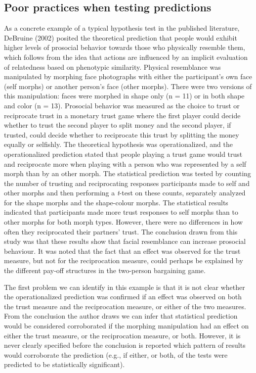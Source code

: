 \documentclass[english,doc,floatsintext]{apa6}
\begin{document}
\hypertarget{poor-practices-when-testing-predictions}{%
\subsection{Poor practices when testing predictions}\label{poor-practices-when-testing-predictions}}

As a concrete example of a typical hypothesis test in the published literature, DeBruine (2002) posited the theoretical prediction that people would exhibit higher levels of prosocial behavior towards those who physically resemble them, which follows from the idea that actions are influenced by an implicit evaluation of relatedness based on phenotypic similarity. Physical resemblance was manipulated by morphing face photographs with either the participant's own face (self morphs) or another person's face (other morphs). There were two versions of this manipulation: faces were morphed in shape only (n = 11) or in both shape and color (n = 13). Prosocial behavior was measured as the choice to trust or reciprocate trust in a monetary trust game where the first player could decide whether to trust the second player to split money and the second player, if trusted, could decide whether to reciprocate this trust by splitting the money equally or selfishly. The theoretical hypothesis was operationalized, and the operationalized prediction stated that people playing a trust game would trust and reciprocate more when playing with a person who was represented by a self morph than by an other morph. The statistical prediction was tested by counting the number of trusting and reciprocating responses participants made to self and other morphs and then performing a \emph{t}-test on these counts, separately analyzed for the shape morphs and the shape-colour morphs. The statistical results indicated that participants made more trust responses to self morphs than to other morphs for both morph types. However, there were no differences in how often they reciprocated their partners' trust. The conclusion drawn from this study was that these results show that facial resemblance can increase prosocial behaviour. It was noted that the fact that an effect was observed for the trust measure, but not for the reciprocation measure, could perhaps be explained by the different pay-off structures in the two-person bargaining game.

The first problem we can identify in this example is that it is not clear whether the operationalized prediction was confirmed if an effect was observed on both the trust measure and the reciprocation measure, or either of the two measures. From the conclusion the author draws we can infer that statistical prediction would be considered corroborated if the morphing manipulation had an effect on either the trust measure, or the reciprocation measure, or both. However, it is never clearly specified before the conclusion is reported which pattern of results would corroborate the prediction (e.g., if either, or both, of the tests were predicted to be statistically significant).
\end{document}
